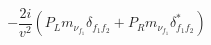 %
\begin{dmath*}
%
  -  \frac{2 i}{v^2} \left(P_L m_{\nu_{f_1}} \delta_{f_1 f_2} + P_R m_{\nu_{f_1}} \delta_{f_1 f_2}^*\right)
%
\end{dmath*}
%
